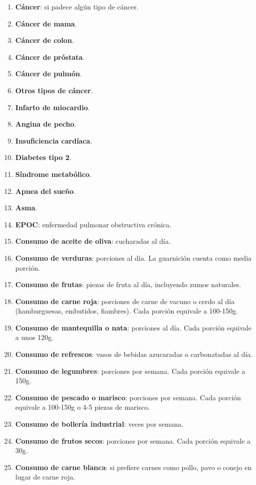 \begin{enumerate}
    \item \textbf{Cáncer}: si padece algún tipo de cáncer.
    \item \textbf{Cáncer de mama}.
    \item \textbf{Cáncer de colon}.
    \item \textbf{Cáncer de próstata}.
    \item \textbf{Cáncer de pulmón}.
    \item \textbf{Otros tipos de cáncer}.
    \item \textbf{Infarto de miocardio}.
    \item \textbf{Angina de pecho}.
    \item \textbf{Insuficiencia cardíaca}.
    \item \textbf{Diabetes tipo 2}.
    \item \textbf{Síndrome metabólico}.
    \item \textbf{Apnea del sueño}.
    \item \textbf{Asma}.
    \item \textbf{EPOC}: enfermedad pulmonar obstructiva crónica.
    \item \textbf{Consumo de aceite de oliva}: cucharadas al día.
    \item \textbf{Consumo de verduras}: porciones al día. La guarnición cuenta como media porción.
    \item \textbf{Consumo de frutas}: piezas de fruta al día, incluyendo zumos naturales.
    \item \textbf{Consumo de carne roja}: porciones de carne de vacuno o cerdo al día (hamburguesas, embutidos, fiambres). Cada porción equivale a 100-150g.
    \item \textbf{Consumo de mantequilla o nata}: porciones al día. Cada porción equivale a unos 120g.
    \item \textbf{Consumo de refrescos}: vasos de bebidas azucaradas o carbonatadas al día.
    \item \textbf{Consumo de legumbres}: porciones por semana. Cada porción equivale a 150g.
    \item \textbf{Consumo de pescado o marisco}: porciones por semana. Cada porción equivale a 100-150g o 4-5 piezas de marisco.
    \item \textbf{Consumo de bollería industrial}: veces por semana.
    \item \textbf{Consumo de frutos secos}: porciones por semana. Cada porción equivale a 30g.
    \item \textbf{Consumo de carne blanca}: si prefiere carnes como pollo, pavo o conejo en lugar de carne roja.

\end{enumerate}
